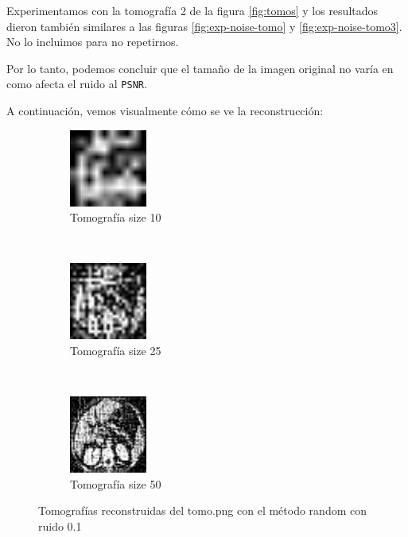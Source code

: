 Experimentamos con la tomografía 2 de la figura \ref{fig:tomos} y los resultados dieron también similares a las figuras \ref{fig:exp-noise-tomo} y \ref{fig:exp-noise-tomo3}. No lo incluimos para no repetirnos.


Por lo tanto, podemos concluir que el tamaño de la imagen original no varía en como afecta el ruido al \verb|PSNR|.

A continuación, vemos visualmente cómo se ve la reconstrucción:

\begin{figure}[H]
	\centering
    \begin{subfigure}[t]{0.3\textwidth}
        \centering
        \includegraphics[height=1.0in]{img/noise/1.png}
        \caption{Tomografía size 10}
    \end{subfigure}
    ~ 
    \begin{subfigure}[t]{0.3\textwidth}
        \centering
        \includegraphics[height=1.0in]{img/noise/2.png}
        \caption{Tomografía size 25}
	\label{tomo:2}
    \end{subfigure}
    ~ 
    \begin{subfigure}[t]{0.3\textwidth}
        \centering
        \includegraphics[height=1.0in]{img/noise/3.png}
        \caption{Tomografía size 50}
    \end{subfigure}
    \caption{Tomografías reconstruidas del tomo.png con el método random con ruido 0.1}
	\label{fig:resultados-noise1}
\end{figure}

